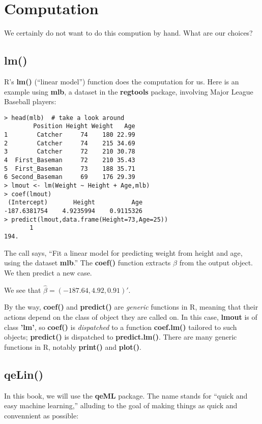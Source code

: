 \section{Computation}

We certainly do not want to do this compution by hand.  What are our
choices?

\subsection{lm()}

R's \textbf{lm()} (``linear model'') function does the computation for
us.  Here is an example using \textbf{mlb}, a dataset in the
\textbf{regtools} package, involving Major League Baseball players:

\begin{lstlisting}
> head(mlb)  # take a look around
        Position Height Weight   Age
1        Catcher     74    180 22.99
2        Catcher     74    215 34.69
3        Catcher     72    210 30.78
4  First_Baseman     72    210 35.43
5  First_Baseman     73    188 35.71
6 Second_Baseman     69    176 29.39
> lmout <- lm(Weight ~ Height + Age,mlb)
> coef(lmout)
 (Intercept)       Height          Age 
-187.6381754    4.9235994    0.9115326 
> predict(lmout,data.frame(Height=73,Age=25))
       1 
194.
\end{lstlisting}

The call says, ``Fit a linear model for predicting weight from height
and age, using the dataset \textbf{mlb}.''  The \textbf{coef()} function
extracts $\widehat{\beta}$ from the output object.  We then predict a
new case.

We see that $\widehat{\beta} = (-187.64,4.92,0.91)'$. 

By the way, \textbf{coef()} and \textbf{predict()} are \textit{generic}
functions in R, meaning that their actions depend on the class of object
they are called on.  In this case, \textbf{lmout} is of class
\textbf{'lm'}, so \textbf{coef()} is \textit{dispatched} to a function
\textbf{coef.lm()} tailored to such objects; \textbf{predict()} is
dispatched to \textbf{predict.lm()}.  There are many generic functions
in R, notably \textbf{print()} and \textbf{plot()}.

\subsection{qeLin()}

In this book, we will use the \textbf{qeML} package.  The name stands
for ``quick and easy machine learning,'' alluding to the goal of making
things as quick and convennient as possible:

